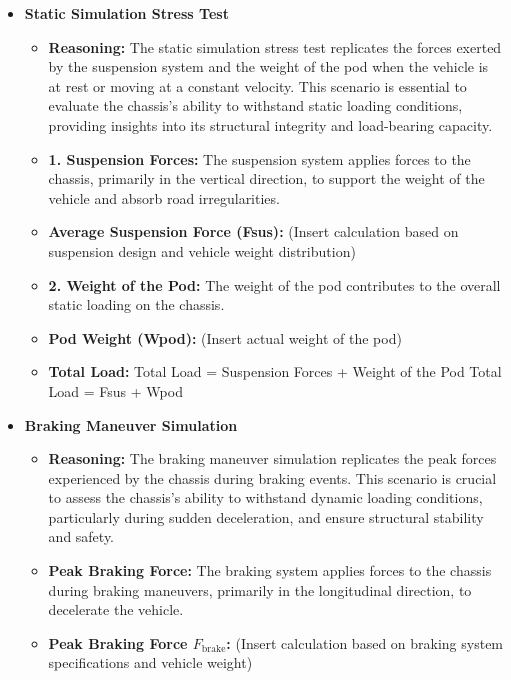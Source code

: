 \begin{itemize}
  \item \textbf{Static Simulation Stress Test}
    \begin{itemize}
      \item \textbf{Reasoning:} The static simulation stress test replicates the forces exerted by the 		suspension system and the weight of the pod when the vehicle is at rest or moving at a 					constant velocity. This scenario is essential to evaluate the chassis's ability to withstand 				static loading conditions, providing insights into its structural integrity and load-bearing 				capacity.

	  \item \textbf{1.	Suspension Forces:} 
		The suspension system applies forces to the chassis, primarily in the vertical direction, to 				support the weight of the vehicle and absorb road irregularities.

	  \item \textbf{Average Suspension Force (Fsus):}
		(Insert calculation based on suspension design and vehicle weight distribution)

	  \item \textbf{2.	Weight of the Pod:} 
		The weight of the pod contributes to the overall static loading on the chassis.

	  \item \textbf{Pod Weight (Wpod):} 
		(Insert actual weight of the pod)

	  \item \textbf{Total Load:}
		Total Load = Suspension Forces + Weight of the Pod Total Load = Fsus + Wpod
	\end{itemize}
\end{itemize}

\begin{itemize}
  \item \textbf{Braking Maneuver Simulation}
    \begin{itemize}
      \item \textbf{Reasoning:} The braking maneuver simulation replicates the peak forces experienced by the chassis during braking events. This scenario is crucial to assess the chassis's ability to withstand dynamic loading conditions, particularly during sudden deceleration, and ensure structural stability and safety.
      \item \textbf{Peak Braking Force:} The braking system applies forces to the chassis during braking maneuvers, primarily in the longitudinal direction, to decelerate the vehicle.
      \item \textbf{Peak Braking Force \(F_{\text{brake}}\):} (Insert calculation based on braking system specifications and vehicle weight)
    \end{itemize}
\end{itemize}

